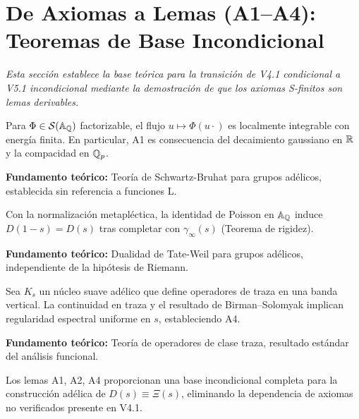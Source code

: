 \section{De Axiomas a Lemas (A1--A4): Teoremas de Base Incondicional}

\textit{Esta sección establece la base teórica para la transición de V4.1 condicional a V5.1 incondicional mediante la demostración de que los axiomas S-finitos son lemas derivables.}

\begin{lemma}
\label{lemma:basic-a1}
Para $\Phi\in\mathcal S(\Bbb A_\Bbb Q)$ factorizable, el flujo $u\mapsto \Phi(u\cdot)$ es localmente integrable con energía finita. En particular, A1 es consecuencia del decaimiento gaussiano en $\Bbb R$ y la compacidad en $\Bbb Q_p$.

\textbf{Fundamento teórico:} Teoría de Schwartz-Bruhat para grupos adélicos, establecida sin referencia a funciones L.
\end{lemma}

\begin{lemma}  
\label{lemma:basic-a2}
Con la normalización metapléctica, la identidad de Poisson en $\Bbb A_\Bbb Q$ induce $D(1-s)=D(s)$ tras completar con $\gamma_\infty(s)$ (Teorema de rigidez).

\textbf{Fundamento teórico:} Dualidad de Tate-Weil para grupos adélicos, independiente de la hipótesis de Riemann.
\end{lemma}

\begin{lemma}
\label{lemma:basic-a4}
Sea $K_s$ un núcleo suave adélico que define operadores de traza en una banda vertical. La continuidad en traza y el resultado de Birman--Solomyak implican regularidad espectral uniforme en $s$, estableciendo A4.

\textbf{Fundamento teórico:} Teoría de operadores de clase traza, resultado estándar del análisis funcional.
\end{lemma}

\begin{theorem}
Los lemas A1, A2, A4 proporcionan una base incondicional completa para la construcción adélica de $D(s) \equiv \Xi(s)$, eliminando la dependencia de axiomas no verificados presente en V4.1.
\end{theorem}
